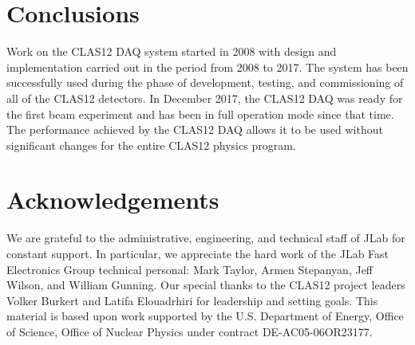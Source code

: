 \section{Conclusions}

Work on the CLAS12 DAQ system started in 2008 with design and implementation carried out in the period from 
2008 to 2017. The system has been successfully used during the phase of development, testing, and commissioning of all
of the CLAS12 detectors. In December 2017, the CLAS12 DAQ was ready for the first beam experiment and has been
in full operation mode since that time. The performance achieved by the CLAS12 DAQ allows it to be used without
significant changes for the entire CLAS12 physics program.

\section{Acknowledgements}

We are grateful to the administrative, engineering, and technical staff of JLab for constant support. In particular, we
appreciate the hard work of the JLab Fast Electronics Group technical personal: Mark Taylor, Armen Stepanyan, Jeff
Wilson, and William Gunning. Our special thanks to the CLAS12 project leaders Volker Burkert and Latifa Elouadrhiri
for leadership and setting goals. This material is based upon work supported by the U.S. Department of Energy, Office
of Science, Office of Nuclear Physics under contract DE-AC05-06OR23177.

